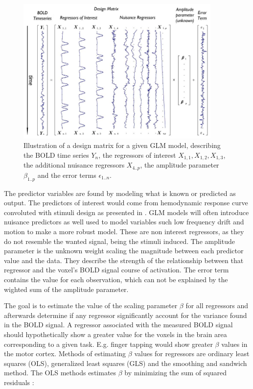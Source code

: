 \begin{figure}[H] 
	\includegraphics[width=0.90\textwidth]{figures/aBackground/GLM}
	\caption{Illustration of a design matrix for a given GLM model, describing the BOLD time series $Y_n$, the regressors of interest $X_{1,1}, X_{1,2}, X_{1,3}$, the additional nuisance regressors $X_{4..p}$, the amplitude parameter $\beta_{1..p}$ and the error terms $\epsilon_{1..n}$. \cite{Monti2011}}
	\label{fig:GLM}
\end{figure}



The predictor variables are found by modeling what is known or predicted as output. The predictors of interest would come from hemodynamic response curve convoluted with stimuli design as presented in . GLM models will often introduce nuisance predictors as well used to model variables such low frequency drift and motion to make a more robust model. These are non interest regressors, as they do not resemble the wanted signal, being the stimuli induced. The amplitude parameter is the unknown weight scaling the magnitude between each predictor value and the data. They describe the strength of the relationship between that regressor and the voxel's BOLD signal course of activation. The error term contains the value for each observation, which can not be explained by the wighted sum of the amplitude parameter. \cite{Moayedi2018,Monti2011} 

The goal is to estimate the value of the scaling parameter $\beta$ for all regressors and afterwards determine if any regressor significantly account for the variance found in the BOLD signal. A regressor associated with the measured BOLD signal should hypothetically show a greater value for the voxels in the brain area corresponding to a given task. E.g. finger tapping would show greater $\beta$ values in the motor cortex. Methods of estimating $\beta$ values for regressors are ordinary least squares (OLS), generalized least squares (GLS) and the smoothing and sandwich method. The OLS methods estimates $\beta$ by minimizing the sum of squared residuals \cite{Monti2011}: 

